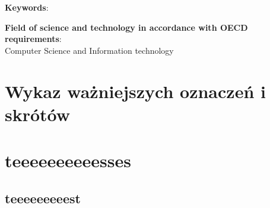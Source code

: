 \documentclass[10pt, a4paper]{report}
\begin{document}
\noindent
\textbf{Keywords}:

\noindent
\textbf{Field of science and technology in accordance with OECD requirements}:\\
Computer Science and Information technology
\newpage

\renewcommand{\contentsname}{\fontsize{12pt}{15pt}\selectfont\bfseries SPIS TREŚCI}


\tableofcontents


\newpage
{}
\section*{Wykaz ważniejszych oznaczeń i skrótów}




\section{teeeeeeeeeesses}
\subsection{teeeeeeeeest}
\end{document}
